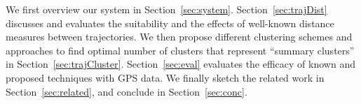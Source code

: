 \begin{comment}To demonstrate, we implement two use-cases (Next-Path Prediction and Anomalous Movement Detection) which utilize trajectory summary to demonstrate that one-time computation and storage of user's mobility summary significantly reduces the complexity of different use-cases. These applications benefit from the fast lookup of mobility summary to derive insights instead of querying all user trajectories. 
\end{comment}

We first overview our system in Section~\ref{sec:system}. Section~\ref{sec:trajDist} discusses and evaluates the suitability and the effects of well-known distance measures between trajectories. We then propose different clustering schemes and approaches to find optimal number of clusters that represent ``summary clusters'' in Section~\ref{sec:trajCluster}. Section~\ref{sec:eval} evaluates the efficacy of known and proposed techniques with GPS data. We finally sketch the related work in Section~\ref{sec:related}, and conclude in Section~\ref{sec:conc}.

